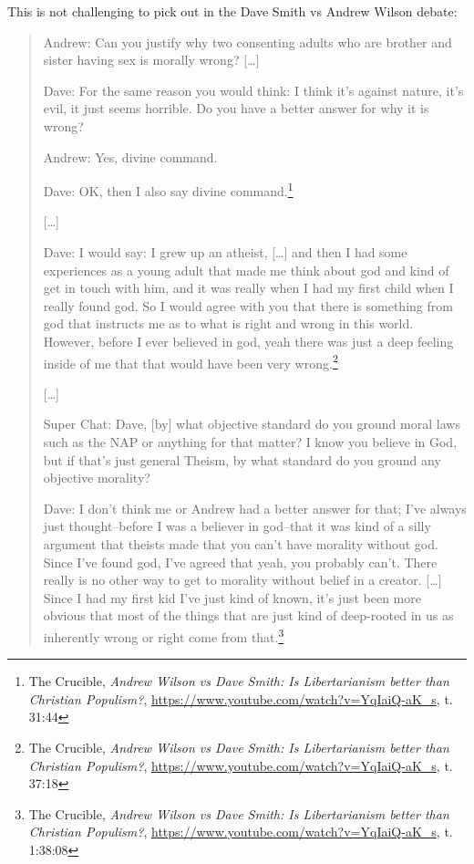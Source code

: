 \documentclass[11pt]{article}
\begin{document}
This is not challenging to pick out in the Dave Smith vs Andrew Wilson debate:
\begin{quote}
Andrew: Can you justify why two consenting adults who are brother and sister having sex is morally wrong? [\ldots{}]

Dave: For the same reason you would think: I think it's against nature, it's evil, it just seems horrible. Do you have a better answer for why it is wrong?

Andrew: Yes, divine command.

Dave: OK, then I also say divine command.\footnote{The Crucible, \emph{Andrew Wilson vs Dave Smith: Is Libertarianism better than Christian Populism?}, \url{https://www.youtube.com/watch?v=YqIaiQ-aK\_s}, t. 31:44}

{[}\ldots{}]

Dave: I would say: I grew up an atheist, [\ldots{}] and then I had some experiences as a young adult that made me think about god and kind of get in touch with him, and it was really when I had my first child when I really found god. So I would agree with you that there is something from god that instructs me as to what is right and wrong in this world. However, before I ever believed in god, yeah there was just a deep feeling inside of me that that would have been very wrong.\footnote{The Crucible, \emph{Andrew Wilson vs Dave Smith: Is Libertarianism better than Christian Populism?}, \url{https://www.youtube.com/watch?v=YqIaiQ-aK\_s}, t. 37:18}

{[}\ldots{}]

Super Chat: Dave, [by] what objective standard do you ground moral laws such as the NAP or anything for that matter? I know you believe in God, but if that's just general Theism, by what standard do you ground any objective morality?

Dave: I don't think me or Andrew had a better answer for that; I've always just thought--before I was a believer in god--that it was kind of a silly argument that theists made that you can't have morality without god. Since I've found god, I've agreed that yeah, you probably can't. There really is no other way to get to morality without belief in a creator. [\ldots{}] Since I had my first kid I've just kind of known, it's just been more obvious that most of the things that are just kind of deep-rooted in us as inherently wrong or right come from that.\footnote{The Crucible, \emph{Andrew Wilson vs Dave Smith: Is Libertarianism better than Christian Populism?}, \url{https://www.youtube.com/watch?v=YqIaiQ-aK\_s}, t. 1:38:08}
\end{quote}
\end{document}
